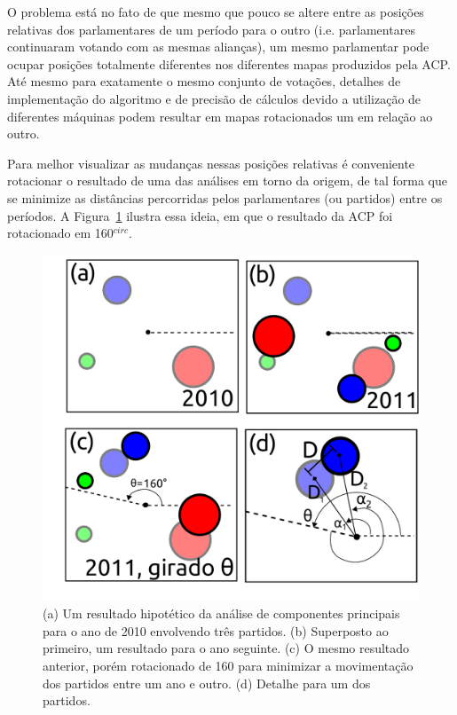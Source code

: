 \documentclass[
	article,			%
	12pt,				%
	oneside,			%
	a4paper,			%
	english,			%
	brazil,				%
	sumario=tradicional,
	oldfontcommands %
	]{abntex2}
\begin{document}
O problema está no fato de que mesmo que pouco se altere entre as posições relativas dos parlamentares de um período para o outro (i.e. parlamentares continuaram votando com as mesmas alianças), um mesmo parlamentar pode ocupar posições totalmente diferentes nos diferentes mapas produzidos pela ACP. Até mesmo para exatamente o mesmo conjunto de votações, detalhes de implementação do algoritmo e de precisão de cálculos devido a utilização de diferentes máquinas podem resultar em mapas rotacionados um em relação ao outro.

Para melhor visualizar as mudanças nessas posições relativas é conveniente rotacionar o resultado de uma das análises em torno da origem, de tal forma que se minimize as distâncias percorridas pelos parlamentares (ou partidos) entre os períodos. A Figura~\ref{fig:rotacoes} ilustra essa ideia, em que o resultado da
ACP foi rotacionado em 160$^{circ}$. \\

\begin{figure}[h]
  \centering
  \includegraphics[scale=0.5]{figs/rotacoes.pdf}
  \caption{(a) Um resultado hipotético da análise de componentes principais para o ano de 2010 envolvendo três partidos. (b) Superposto ao primeiro, um resultado para o ano seguinte. (c) O mesmo resultado anterior, porém rotacionado de 160\textdegree{} para minimizar a movimentação dos partidos entre um ano e outro. (d) Detalhe para um dos partidos.}
  \label{fig:rotacoes}
\end{figure}
\end{document}

